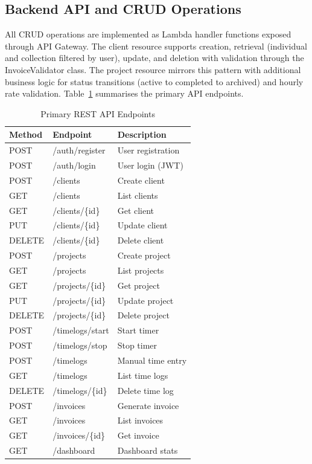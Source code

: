 \documentclass[conference]{IEEEtran}
\begin{document}
\subsection{Backend API and CRUD Operations}

All CRUD operations are implemented as Lambda handler functions exposed through API Gateway. The client resource supports creation, retrieval (individual and collection filtered by user), update, and deletion with validation through the InvoiceValidator class. The project resource mirrors this pattern with additional business logic for status transitions (active to completed to archived) and hourly rate validation. Table~\ref{tab:endpoints} summarises the primary API endpoints.

\begin{table}[H]
\centering
\caption{Primary REST API Endpoints}
\label{tab:endpoints}
\begin{tabular}{|l|l|l|}
\hline
\textbf{Method} & \textbf{Endpoint} & \textbf{Description} \\
\hline
POST & /auth/register & User registration \\
POST & /auth/login & User login (JWT) \\
\hline
POST & /clients & Create client \\
GET & /clients & List clients \\
GET & /clients/\{id\} & Get client \\
PUT & /clients/\{id\} & Update client \\
DELETE & /clients/\{id\} & Delete client \\
\hline
POST & /projects & Create project \\
GET & /projects & List projects \\
GET & /projects/\{id\} & Get project \\
PUT & /projects/\{id\} & Update project \\
DELETE & /projects/\{id\} & Delete project \\
\hline
POST & /timelogs/start & Start timer \\
POST & /timelogs/stop & Stop timer \\
POST & /timelogs & Manual time entry \\
GET & /timelogs & List time logs \\
DELETE & /timelogs/\{id\} & Delete time log \\
\hline
POST & /invoices & Generate invoice \\
GET & /invoices & List invoices \\
GET & /invoices/\{id\} & Get invoice \\
\hline
GET & /dashboard & Dashboard stats \\
\hline
\end{tabular}
\end{table}
\end{document}
